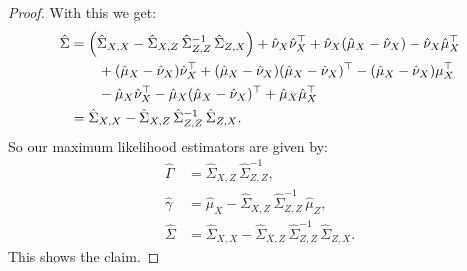 \begin{Lem}
\begin{proof}
With this we get:
\begin{align*}
    \hat \Sigma &= \left ( \hat\Sigma_{X,X} -\hat\Sigma_{X,Z}\,\hat\Sigma_{Z,Z}^{-1}\,\hat\Sigma_{Z,X} \right ) 
     + \hat\nu_X\hat\nu_X^\top + \hat\nu_X (\hat\mu_X-\hat\nu_X) - \hat\nu_X\hat\mu_X^\top \\ 
    &\qquad + (\hat\mu_X-\hat\nu_X) \hat\nu_X^\top + (\hat\mu_X-\hat\nu_X)(\hat\mu_X-\hat\nu_X)^\top - 
    (\hat\mu_X-\hat\nu_X) \mu_X^\top  \\
    &\qquad - \hat\mu_X \hat\nu_X^\top - \hat\mu_X (\hat\mu_X-\hat\nu_X)^\top  + \hat\mu_X\hat\mu_X^\top\\
    & =\hat\Sigma_{X,X} -\hat\Sigma_{X,Z}\,\hat\Sigma_{Z,Z}^{-1}\,\hat\Sigma_{Z,X}.
\end{align*}
So our maximum likelihood estimators are given by:
\begin{align*}
    \hat\Gamma & = \hat\Sigma_{X,Z} \,\hat\Sigma_{Z,Z}^{-1}, \\
    \hat\gamma & = \hat \mu_X - \hat\Sigma_{X,Z} \,\hat\Sigma_{Z,Z}^{-1}\,\hat\mu_Z, \\
    \hat \Sigma &= \hat\Sigma_{X,X} -\hat\Sigma_{X,Z}\,\hat\Sigma_{Z,Z}^{-1}\,\hat\Sigma_{Z,X}.
\end{align*}
This shows the claim.
    \end{proof}
\end{Lem}


